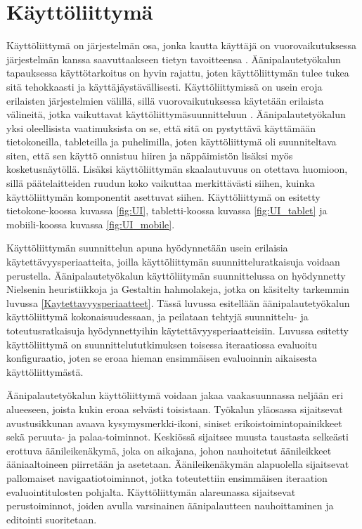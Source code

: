 \documentclass[utf8]{gradu3}
\begin{document}
\section{Käyttöliittymä}
\label{Kayttoliittyma}

Käyttöliittymä on järjestelmän osa, jonka kautta käyttäjä on vuorovaikutuksessa järjestelmän kanssa saavuttaakseen tietyn tavoitteensa \parencite{stone}. Äänipalautetyökalun tapauksessa käyttötarkoitus on hyvin rajattu, joten käyttöliittymän tulee tukea sitä tehokkaasti ja käyttäjäystävällisesti. Käyttöliittymissä on usein eroja erilaisten järjestelmien välillä, sillä vuorovaikutuksessa käytetään erilaista välineitä, jotka vaikuttavat käyttöliittymäsuunnitteluun \parencite{stone}. Äänipalautetyökalun yksi oleellisista vaatimuksista on se, että sitä on pystyttävä käyttämään tietokoneilla, tableteilla ja puhelimilla, joten käyttöliittymä oli suunniteltava siten, että sen käyttö onnistuu hiiren ja näppäimistön lisäksi myös kosketusnäytöllä. Lisäksi käyttöliittymän skaalautuvuus on otettava huomioon, sillä päätelaitteiden ruudun koko vaikuttaa merkittävästi siihen, kuinka käyttöliittymän komponentit asettuvat siihen. Käyttöliittymä on esitetty tietokone-koossa kuvassa \ref{fig:UI}, tabletti-koossa kuvassa \ref{fig:UI_tablet} ja mobiili-koossa kuvassa \ref{fig:UI_mobile}.

Käyttöliittymän suunnittelun apuna hyödynnetään usein erilaisia käytettävyysperiaatteita, joilla käyttöliittymän suunnitteluratkaisuja voidaan perustella. Äänipalautetyökalun käyttöliitymän suunnittelussa on hyödynnetty Nielsenin heuristiikkoja ja Gestaltin hahmolakeja, jotka on käsitelty tarkemmin luvussa \ref{Kaytettavyysperiaatteet}. Tässä luvussa esitellään äänipalautetyökalun käyttöliittymä kokonaisuudessaan, ja peilataan tehtyjä suunnittelu- ja toteutusratkaisuja hyödynnettyihin käytettävyysperiaatteisiin. Luvussa esitetty käyttöliittymä on suunnittelututkimuksen toisessa iteraatiossa evaluoitu konfiguraatio, joten se eroaa hieman ensimmäisen evaluoinnin aikaisesta käyttöliittymästä. 

Äänipalautetyökalun käyttöliittymä voidaan jakaa vaakasuunnassa neljään eri alueeseen, joista kukin eroaa selvästi toisistaan. Työkalun yläosassa sijaitsevat avustusikkunan avaava kysymysmerkki-ikoni, siniset erikoistoimintopainikkeet sekä peruuta- ja palaa-toiminnot. Keskiössä sijaitsee muusta taustasta selkeästi erottuva äänileikenäkymä, joka on aikajana, johon nauhoitetut äänileikkeet ääniaaltoineen piirretään ja asetetaan. Äänileikenäkymän alapuolella sijaitsevat pallomaiset navigaatiotoiminnot, jotka toteutettiin ensimmäisen iteraation evaluointitulosten pohjalta. Käyttöliittymän alareunassa sijaitsevat perustoiminnot, joiden avulla varsinainen äänipalautteen nauhoittaminen ja editointi suoritetaan. 
\end{document}
